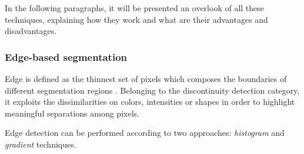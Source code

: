 \documentclass[../main.tex]{subfiles}
\begin{document}
In the following paragraphs, it will be presented an overlook of all these techniques, explaining how they work and what are their advantages and disadvantages.





\subsubsection{\large{Edge-based segmentation}}

Edge is defined as the thinnest set of pixels which composes the boundaries of different segmentation regions \cite{kang2009comparative}. Belonging to the discontinuity detection category, it exploits the dissimilarities on colors, intensities or shapes in order to highlight meaningful separations among pixels.

Edge detection can be performed according to two approaches: \textit{histogram} and \textit{gradient} techniques.
\end{document}

